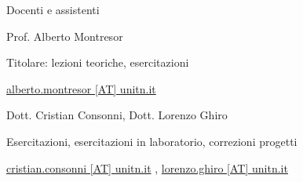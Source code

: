 \begin{frame}{Docenti e assistenti}
	
\BIL
\item Prof. Alberto Montresor
\BI
\item Titolare: lezioni teoriche, esercitazioni
\item \underline{alberto.montresor [AT] unitn.it}
\EI
\item Dott. Cristian Consonni,  Dott. Lorenzo Ghiro
\BI
\item Esercitazioni, esercitazioni in laboratorio, correzioni progetti
\item \underline{cristian.consonni [AT] unitn.it} , \underline{lorenzo.ghiro [AT] unitn.it}
\EI
\EIL
\end{frame}

